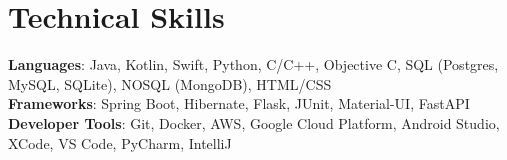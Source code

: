 \documentclass[letterpaper,11pt]{article}
\begin{document}
\section{Technical Skills}
 \begin{itemize}[leftmargin=0.15in, label={}]
    \small{\item{
     \textbf{Languages}{: Java, Kotlin, Swift, Python, C/C++, Objective C, SQL (Postgres, MySQL, SQLite), NOSQL (MongoDB), HTML/CSS} \\
     \textbf{Frameworks}{: Spring Boot, Hibernate, Flask, JUnit, Material-UI, FastAPI} \\
     \textbf{Developer Tools}{: Git, Docker, AWS, Google Cloud Platform, Android Studio, XCode, VS Code, PyCharm, IntelliJ } \\
    }}
 \end{itemize}
\end{document}
